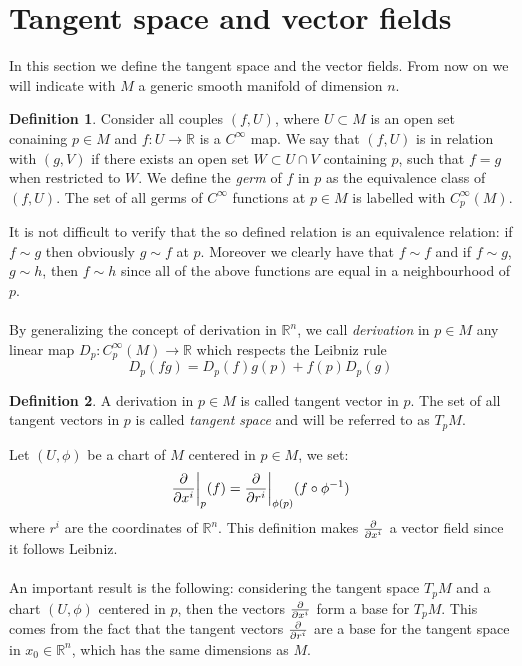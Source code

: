 \documentclass[12pt,a4paper]{report}
\theoremstyle{definition}
\newtheorem{Def}{Definition}[chapter]
\theoremstyle{Theorem}
\theoremstyle{definition}
\theoremstyle{definition}
\begin{document}
		\section{Tangent space and vector fields}
		In this section we define the tangent space and the vector fields. From now on we will indicate with $M$ a generic smooth manifold of dimension $n$. 
		\begin{Def}
			Consider all couples $(f,U)$, where $U\subset M$ is an open set conaining $p\in M$ and $f:U\rightarrow \mathbb{R}$ is a $C^\infty$ map. We say that $(f,U)$ is in relation with $(g,V)$ if there exists an open set $W\subset U\cap V$ containing $p$, such that $f=g$ when restricted to $W$. We define the \textit{germ} of $f$ in $p$ as the equivalence class of $(f,U)$.
			The set of all germs of $C^\infty$ functions at $p\in M$ is labelled with $C^\infty_p(M)$.
		\end{Def}
		It is not difficult to verify that the so defined relation is an equivalence relation: if $f\sim g$ then obviously $g\sim f$ at $p$. Moreover we clearly have that $f\sim f$ and if $f\sim g$, $g\sim h$, then $f\sim h$ since all of the above functions are equal in a neighbourhood of $p$.\\
		\\
		By generalizing the concept of derivation in $\mathbb{R}^n$, we call \textit{derivation} in $p\in M$ any linear map $D_p:C^\infty_p(M)\rightarrow\mathbb{R}$ which respects the Leibniz rule 
		$$D_p(fg)=D_p(f)g(p)+f(p)D_p(g)$$
		\begin{Def}
			A derivation in $p\in M$ is called tangent vector in $p$. The set of all tangent vectors in $p$ is called \textit{tangent space} and will be referred to as $T_pM$.
		\end{Def} 
		Let $(U,\phi)$ be a chart of $M$ centered in $p\in M$, we set:
		$${\partial\over \partial x^i}\bigg\rvert_p(f)={\partial\over \partial r^i}\bigg\rvert_{\phi(p)}(f\circ \phi^{-1})$$ where $r^i$ are the coordinates of $\mathbb{R}^n$. This definition makes ${\partial\over \partial x^i}$ a vector field since it follows Leibniz.\\
		\\
		An important result is the following: considering the tangent space $T_pM$ and a chart $(U,\phi)$ centered in $p$, then the vectors $\partial\over \partial x^i$ form a base for $T_pM$. This comes from the fact that the tangent vectors $\partial\over \partial r^i$ are a base for the tangent space in $x_0\in\mathbb{R}^n$, which has the same dimensions as $M$.\\
\end{document}

